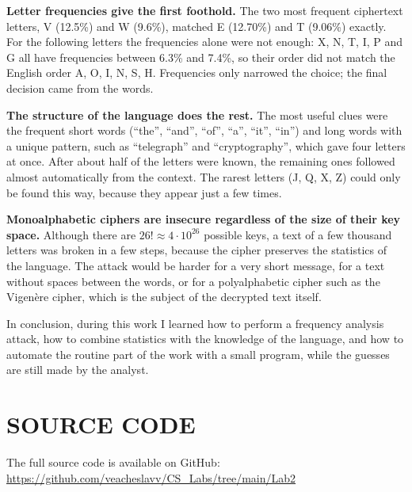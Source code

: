 \documentclass[12pt,a4paper]{article}
\begin{document}
\textbf{Letter frequencies give the first foothold.} The two most frequent ciphertext
letters, V (12.5\%) and W (9.6\%), matched E (12.70\%) and T (9.06\%) exactly. For the
following letters the frequencies alone were not enough: X, N, T, I, P and G all have
frequencies between 6.3\% and 7.4\%, so their order did not match the English order A, O, I,
N, S, H. Frequencies only narrowed the choice; the final decision came from the words.

\textbf{The structure of the language does the rest.} The most useful clues were the
frequent short words (``the'', ``and'', ``of'', ``a'', ``it'', ``in'') and long words with a
unique pattern, such as ``telegraph'' and ``cryptography'', which gave four letters at once.
After about half of the letters were known, the remaining ones followed almost
automatically from the context. The rarest letters (J, Q, X, Z) could only be found this
way, because they appear just a few times.

\textbf{Monoalphabetic ciphers are insecure regardless of the size of their key space.}
Although there are $26! \approx 4 \cdot 10^{26}$ possible keys, a text of a few thousand
letters was broken in a few steps, because the cipher preserves the statistics of the
language. The attack would be harder for a very short message, for a text without spaces
between the words, or for a polyalphabetic cipher such as the Vigen\`ere cipher, which is
the subject of the decrypted text itself.

In conclusion, during this work I learned how to perform a frequency analysis attack, how to
combine statistics with the knowledge of the language, and how to automate the routine part
of the work with a small program, while the guesses are still made by the analyst.

\section{SOURCE CODE}

The full source code is available on GitHub:
\url{https://github.com/veacheslavv/CS_Labs/tree/main/Lab2}
\end{document}
